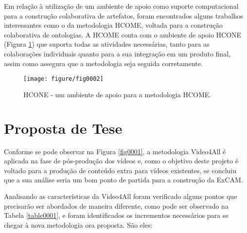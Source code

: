 \documentclass{sig-alternate}
\begin{document}
Em relação à utilização de um ambiente de apoio como suporte computacional para a construção colaborativa de artefatos, foram encontrados alguns trabalhos interessantes como o da metodologia HCOME\cite{ Kotis2006},  voltada para a construção colaborativa de ontologias. A HCOME conta com o ambiente de apoio HCONE (Figura \ref{fig0002}) que suporta todas as atividades necessárias, tanto para as colaborações individuais quanto para a sua integração em um produto final, assim como assegura que a metodologia seja seguida corretamente.

\begin{figure}[!htb]
\centering
\label{fig0002}
\texttt{[image: figure/fig0002]}
\caption{HCONE - um ambiente de apoio para a metodologia HCOME\cite{Kotis2006}.}
\end{figure}


\section{Proposta de Tese}

Conforme se pode observar na Figura \ref{fig0001}, a metodologia Video4All é aplicada na fase de pós-produção dos vídeos e, como o objetivo deste projeto é voltado para a produção de conteúdo extra para vídeos existentes, se concluiu que a sua análise seria um bom ponto de partida para a construção da ExCAM. 

\par Analisando as características da Video4All foram verificado alguns  pontos que precisarão ser abordados de maneira diferente, como pode ser observado na Tabela \ref{table0001}, e foram identificados os incrementos necessários para se chegar à nova metodologia ora proposta. São eles:
\end{document}
